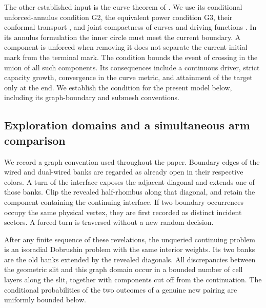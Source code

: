 The other established input is the curve theorem of \cite{KS}.
We use its conditional unforced-annulus condition G2, the equivalent
power condition G3, their conformal transport
\cite[Proposition 2.6 and Remark 2.8]{KS}, and joint compactness of curves
and driving functions \cite[Theorem 1.5 and Corollary 1.7]{KS}.
In its annulus formulation the inner circle must meet the current
boundary. A component is unforced when removing it does not separate
the current initial mark from the terminal mark. The condition bounds
the event of crossing in the union of all such components. Its
consequences include a continuous driver, strict capacity growth,
convergence in the curve metric, and attainment of the target only at
the end. We establish the condition for the present model below,
including its graph-boundary and submesh conventions.

\subsection{Exploration domains and a simultaneous arm comparison}

We record a graph convention used throughout the paper. Boundary edges
of the wired and dual-wired banks are regarded as already open in their
respective colors. A turn of the interface exposes the adjacent
diagonal and extends one of those banks. Clip the revealed half-rhombus
along that diagonal, and retain the component containing the continuing
interface. If two boundary occurrences occupy the same physical vertex,
they are first recorded as distinct incident sectors. A forced turn is
traversed without a new random decision.

\begin{lemma}
\label{geo:domain-markov}
After any finite sequence of these revelations, the unqueried
continuing problem is an isoradial Dobrushin problem with the same
interior weights. Its two banks are the old banks extended by the
revealed diagonals. All discrepancies between the geometric slit and
this graph domain occur in a bounded number of cell layers along the
slit, together with components cut off from the continuation.
The conditional probabilities of the two outcomes of a genuine new
pairing are uniformly bounded below.
\end{lemma}

